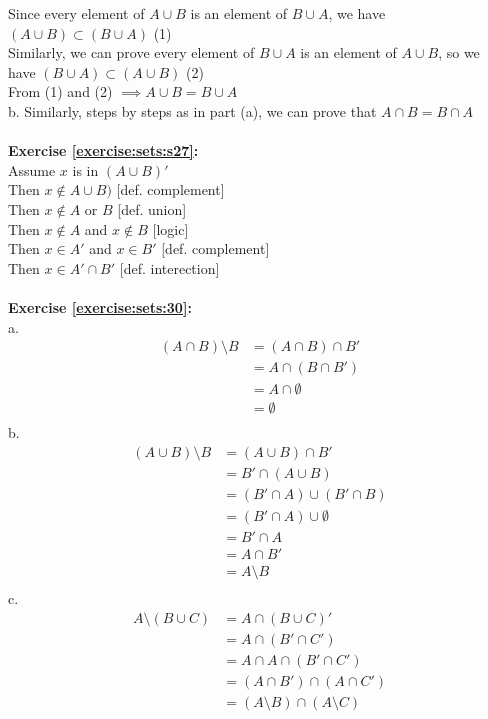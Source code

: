 Since every element of $A\cup B$ is an element of $B\cup A$, we have $(A\cup B)\subset(B\cup A)$ (1)\\
Similarly, we can prove every element of $B\cup A$ is an element of $A\cup B$, so we have $(B\cup A)\subset (A\cup B)$ (2)\\
From (1) and (2) $\implies A\cup B = B\cup A$\\
b. Similarly, steps by steps as in part (a), we can prove that $A\cap B=B\cap A$\\
\\
\textbf{Exercise \ref{exercise:sets:s27}:}\\
Assume $x$ is in $(A\cup B)'$\\
Then $x \notin A \cup B)$ [def. complement]\\
Then $x \notin A$ or $B$ [def. union]\\
Then $x \notin A$ and $x \notin B$ [logic]\\
Then $x \in A'$ and $x \in B'$ [def. complement]\\
Then $x \in A' \cap B'$ [def. interection]\\
\\
\textbf{Exercise \ref{exercise:sets:30}:}\\
a.\begin{align*}
(A\cap B) \setminus B & =(A\cap B)\cap B'\\
& = A\cap (B\cap B')\\
& = A\cap \emptyset\\
& = \emptyset\\
\end{align*}
b.\begin{align*}
(A\cup B) \setminus B & =(A\cup B)\cap B'\\
& = B'\cap (A\cup B)\\
& = (B'\cap A)\cup(B'\cap B)\\
& = (B'\cap A)\cup \emptyset\\
& = B'\cap A\\
& = A\cap B'\\
& = A\setminus B\\
\end{align*}
c.\begin{align*}
A\setminus (B\cup C) & =A\cap (B\cup C)'\\
& = A\cap (B'\cap C')\\
& = A\cap A\cap(B'\cap C')\\
& = (A\cap B')\cap (A\cap C')\\
& = (A\setminus B)\cap (A\setminus C)\\
\end{align*}
